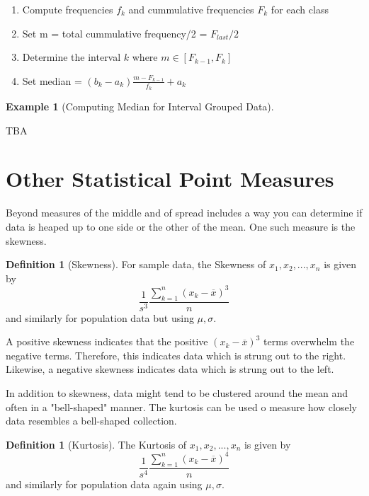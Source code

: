 \documentclass[10pt,]{book}
\theoremstyle{plain}
\theoremstyle{definition}
\newtheorem{definition}[theorem]{Definition}
\theoremstyle{definition}
\newtheorem{example}[theorem]{Example}
\theoremstyle{definition}
\numberwithin{equation}{section}
\begin{document}
\leavevmode%
\begin{enumerate}
\item\hypertarget{li-33}{}Compute frequencies \(f_k\) and cummulative frequencies \(F_k\) for each class%
\item\hypertarget{li-34}{}Set m = total cummulative frequency/2 = \(F_{last}/2\)%
\item\hypertarget{li-35}{}Determine the interval \(k\) where \(m \in [F_{k-1},F_k]\)%
\item\hypertarget{li-36}{}Set median = \((b_k-a_k)\frac{m - F_{k-1}}{f_k}+a_k\)%
\end{enumerate}

%
\begin{example}[Computing Median for Interval Grouped Data]\label{example-8}

TBA
%
\end{example}
\typeout{************************************************}
\typeout{************************************************}
\section[{Other Statistical Point Measures}]{Other Statistical Point Measures}\label{section-7}
Beyond measures of the middle and of spread includes a way you can determine if data is heaped up to one side or the other of the mean. One such measure is the skewness.
%
\begin{definition}[{Skewness}]\label{definition-12}
For sample data, the Skewness of \(x_1, x_2, ..., x_n\) is given by
\begin{equation*} \frac{1}{s^3} \frac{\sum_{k=1}^n ( x_k-\overline{x} )^3}{n}\end{equation*}
and similarly for population data but using \(\mu, \sigma\).%
\end{definition}
\par

A positive skewness indicates that the positive \((x_k - \overline{x})^3\) terms overwhelm the negative terms. Therefore, this indicates data which is strung out to the right. Likewise, a negative skewness indicates data which is strung out to the left.
%
\par

In addition to skewness, data might tend to be clustered around the mean and often in a "bell-shaped" manner. The kurtosis can be used o measure how closely data resembles a bell-shaped collection.
%
\begin{definition}[{Kurtosis}]\label{definition-13}
The Kurtosis of \(x_1, x_2, ..., x_n\) is given by
\begin{equation*} \frac{1}{s^4} \frac{\sum_{k=1}^n ( x_k-\overline{x} )^4}{n}\end{equation*}
and similarly for population data again using \(\mu, \sigma\).
%
\end{definition}
\par
\end{document}

